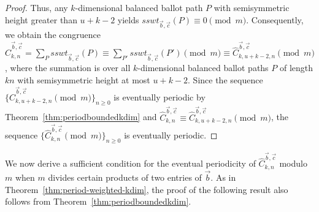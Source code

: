 \documentclass[11pt]{article}
\theoremstyle{remark}
\theoremstyle{definition}
\begin{document}
\begin{proof}
Thus, any $k$-dimensional balanced ballot path $P$ with semisymmetric height greater than $u+k-2$ yields $sswt_{\vec{b}, \vec{c}}(P) \equiv 0 \pmod{m}$. Consequently, we obtain the congruence $\widehat{C}_{k, n}^{\vec{b}, \vec{c}} = \sum_{P}sswt_{\vec{b}, \vec{c}}(P) \equiv \sum_{P'} sswt_{\vec{b}, \vec{c}}(P') \pmod{m} \equiv \widehat{C}_{k, u+k-2, n}^{\vec{b}, \vec{c}} \pmod{m}$, where the summation is over all $k$-dimensional balanced ballot paths $P$ of length $kn$ with semisymmetric height at most $u+k-2$. Since the sequence $\{\widehat{C}_{k,u+k-2,n}^{\vec{b},\vec{c}} \pmod m\}_{n \geq 0}$ is eventually periodic by Theorem~\ref{thm:periodboundedkdim} and $\widehat{C}_{k,n}^{\vec{b},\vec{c}} \equiv \widehat{C}_{k,u+k-2,n}^{\vec{b},\vec{c}} \pmod m$, the sequence $\{\widehat{C}_{k,n}^{\vec{b},\vec{c}} \pmod m\}_{n \geq 0}$ is eventually periodic.
\end{proof}

We now derive a sufficient condition for the eventual periodicity of $\widehat{C}_{k,n}^{\vec{b},\vec{c}}$ modulo $m$ when $m$ divides certain products of two entries of $\vec{b}$. As in Theorem~\ref{thm:period-weighted-kdim}, the proof of the following result also follows from Theorem~\ref{thm:periodboundedkdim}.
\end{document}
